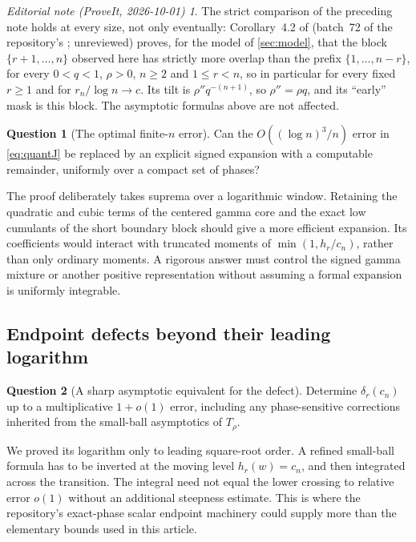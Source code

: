 \documentclass[11pt,oneside]{article}
\numberwithin{equation}{section}
\theoremstyle{plain}
\theoremstyle{definition}
\newtheorem{question}{Question}
\theoremstyle{remark}
\newtheorem*{ednotelater}{Editorial note (ProveIt, 2026-10-01)}
\begin{document}
\begin{ednotelater}
The strict comparison of the preceding note holds at every size, not only eventually:
Corollary~4.2 of  (batch~72 of the repository's
; unreviewed) proves, for the model of \cref{sec:model}, that the block
$\{r+1,\ldots,n\}$ observed here has strictly more overlap than the prefix
$\{1,\ldots,n-r\}$, for every $0<q<1$, $\rho>0$, $n\ge2$ and $1\le r<n$, so in particular for
every fixed $r\ge1$ and for $r_n/\log n\to c$. Its tilt is $\rho''q^{-(n+1)}$, so
$\rho''=\rho q$, and its ``early'' mask is this block. The asymptotic formulas above are not
affected.
\end{ednotelater}

\begin{question}[The optimal finite-$n$ error]
Can the $O((\log n)^3/n)$ error in \eqref{eq:quantJ} be replaced by
an explicit signed expansion with a computable remainder, uniformly
over a compact set of phases?
\end{question}
The proof deliberately takes suprema over a logarithmic window.
Retaining the quadratic and cubic terms of the centered gamma
core and the exact low cumulants of the short boundary block should
give a more efficient expansion. Its coefficients would interact
with truncated moments of $\min(1,h_r/c_n)$, rather than only
ordinary moments. A rigorous answer must control the signed gamma
mixture or another positive representation without assuming a
formal expansion is uniformly integrable.

\subsection{Endpoint defects beyond their leading logarithm}
\begin{question}[A sharp asymptotic equivalent for the defect]
Determine $\delta_r(c_n)$ up to a multiplicative $1+o(1)$ error,
including any phase-sensitive corrections inherited from the
small-ball asymptotics of $T_\rho$.
\end{question}
We proved its logarithm only to leading square-root order.
A refined small-ball formula has to be inverted at the moving
level $h_r(w)=c_n$, and then integrated across the transition.
The integral need not equal the lower crossing to relative error
$o(1)$ without an additional steepness estimate. This is where the
repository's exact-phase scalar endpoint machinery could supply
more than the elementary bounds used in this article.
\end{document}
